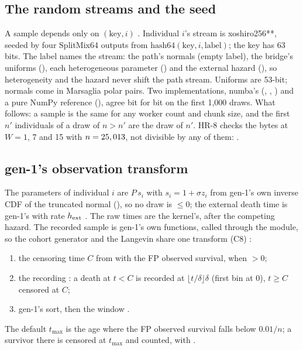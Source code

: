 \subsection{The random streams and the seed}\label{sec:lgv-rng}

A sample depends only on $(\text{key},i)$ . Individual $i$'s stream is xoshiro256**, seeded by
four SplitMix64 outputs from $\mathrm{hash64}(\text{key},i,\text{label})$; the key has 63 bits. The label names the
stream: the path's normals (empty label), the bridge's uniforms (), each heterogeneous parameter
() and the external hazard (), so heterogeneity and the hazard never shift the
path stream. Uniforms are 53-bit; normals come in Marsaglia polar pairs. Two implementations, numba's
(, , ) and a pure NumPy reference (), agree bit for bit
on the first 1,000 draws. What follows: a sample is the same for any worker count and chunk size, and the first $n'$
individuals of a draw of $n>n'$ are the draw of $n'$. HR-8 checks the bytes at $W=1$, 7 and 15 with
$n=\verify{tests/acceptance/results/hr8_004.json}{config.n}{,}{25,013}$, not divisible by any of them:
.

\subsection{gen-1's observation transform}\label{sec:lgv-obs}

The parameters of individual $i$ are $P\,s_i$ with $s_i=1+\sigma z_i$ from gen-1's own inverse CDF of the truncated
normal (), so no draw is $\le0$; the external death time is gen-1's  with
rate $h_{\rm ext}$ . The raw times are the kernel's, after the competing hazard.
The recorded sample is gen-1's own functions, called through the module, so the cohort generator and the Langevin share
one transform (C8) :
\begin{enumerate}[nosep]
  \item the censoring time $C$ from  with the FP observed survival, when  $>0$;
  \item the recording : a death at $t<C$ is recorded at $\lfloor t/\delta\rfloor\delta$ (first bin at 0),
    $t\ge C$ censored at $C$;
  \item gen-1's sort, then the window .
\end{enumerate}
The default $t_{\max}$ is the age where the FP observed survival falls below $0.01/n$; a survivor there is censored at
$t_{\max}$ and counted, with .

